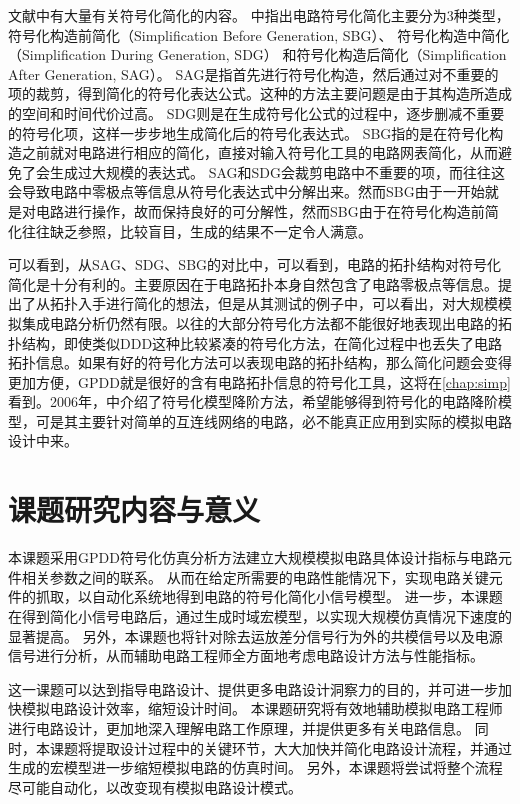 文献中有大量有关符号化简化的内容。
\parencite{Gielen-Review-2002}中指出电路符号化简化主要分为3种类型，
符号化构造前简化（Simplification Before Generation, SBG）\parencite{Hsu-SBG-1994}、
符号化构造中简化（Simplification During Generation, SDG）\parencite{Fern-SDG-1994}
和符号化构造后简化（Simplification After Generation, SAG）\parencite{Gielen-ISAAC-1989,Sheldon-DDDSimp-1999}。
SAG是指首先进行符号化构造，然后通过对不重要的项的裁剪，得到简化的符号化表达公式。这种的方法主要问题是由于其构造所造成的空间和时间代价过高。
SDG则是在生成符号化公式的过程中，逐步删减不重要的符号化项，这样一步步地生成简化后的符号化表达式。
SBG指的是在符号化构造之前就对电路进行相应的简化，直接对输入符号化工具的电路网表简化，从而避免了会生成过大规模的表达式。
SAG和SDG会裁剪电路中不重要的项，而往往这会导致电路中零极点等信息从符号化表达式中分解出来。然而SBG由于一开始就是对电路进行操作，故而保持良好的可分解性，然而SBG由于在符号化构造前简化往往缺乏参照，比较盲目，生成的结果不一定令人满意。

可以看到，从SAG、SDG、SBG的对比中，可以看到，电路的拓扑结构对符号化简化是十分有利的。主要原因在于电路拓扑本身自然包含了电路零极点等信息。\parencite{Zivkovic-TopoSimp-1995}提出了从拓扑入手进行简化的想法，但是从其测试的例子中，可以看出，对大规模模拟集成电路分析仍然有限。以往的大部分符号化方法都不能很好地表现出电路的拓扑结构，即使类似DDD这种比较紧凑的符号化方法，在简化过程中也丢失了电路拓扑信息。如果有好的符号化方法可以表现电路的拓扑结构，那么简化问题会变得更加方便，GPDD就是很好的含有电路拓扑信息的符号化工具，这将在\ref{chap:simp}看到。2006年，\parencite{GShi-SMOR-2006}中介绍了符号化模型降阶方法，希望能够得到符号化的电路降阶模型，可是其主要针对简单的互连线网络的电路，必不能真正应用到实际的模拟电路设计中来。

\section{课题研究内容与意义}
\label{sec:intro:meaning}

本课题采用GPDD符号化仿真分析方法建立大规模模拟电路具体设计指标与电路元件相关参数之间的联系。
从而在给定所需要的电路性能情况下，实现电路关键元件的抓取，以自动化系统地得到电路的符号化简化小信号模型。
进一步，本课题在得到简化小信号电路后，通过生成时域宏模型，以实现大规模仿真情况下速度的显著提高。
另外，本课题也将针对除去运放差分信号行为外的共模信号以及电源信号进行分析，从而辅助电路工程师全方面地考虑电路设计方法与性能指标。

这一课题可以达到指导电路设计、提供更多电路设计洞察力的目的，并可进一步加快模拟电路设计效率，缩短设计时间。
本课题研究将有效地辅助模拟电路工程师进行电路设计，更加地深入理解电路工作原理，并提供更多有关电路信息。
同时，本课题将提取设计过程中的关键环节，大大加快并简化电路设计流程，并通过生成的宏模型进一步缩短模拟电路的仿真时间。
另外，本课题将尝试将整个流程尽可能自动化，以改变现有模拟电路设计模式。

